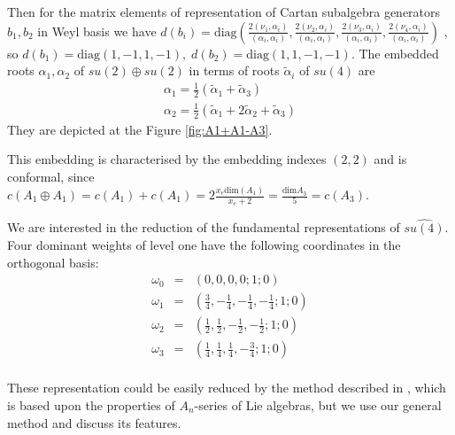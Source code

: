 \documentclass[a4paper,12pt]{article}
\theoremstyle{definition} \newtheorem{Def}{Definition}
\begin{document}
Then for the matrix elements of representation of Cartan subalgebra generators $b_1,b_2$ in Weyl basis we have $d(b_i)=\mathrm{diag}\left(\frac{2(\nu_1,\alpha_i)}{(\alpha_i,\alpha_i)},\frac{2(\nu_2,\alpha_i)}{(\alpha_i,\alpha_i)},\frac{2(\nu_3,\alpha_i)}{(\alpha_i,\alpha_i)},\frac{2(\nu_4,\alpha_i)}{(\alpha_i,\alpha_i)}\right)$ \cite{vasilevich1986method}, so $d(b_1)=\mathrm{diag}(1,-1,1,-1),\; d(b_2)=\mathrm{diag}(1,1,-1,-1)$.  The embedded roots $\alpha_1,\alpha_2$ of $su(2)\oplus su(2)$ in terms of roots $\tilde{\alpha}_i$ of $su(4)$ are
\begin{equation}
  \label{eq:37}
  \begin{array}{l}
     \alpha_1=\frac{1}{2}(\tilde{\alpha}_1+\tilde{\alpha}_3)\\
     \alpha_2=\frac{1}{2}(\tilde{\alpha}_1+2\tilde{\alpha}_2+\tilde{\alpha}_3)
  \end{array}
\end{equation}
They are depicted at the Figure \ref{fig:A1+A1-A3}.

This embedding is characterised by the embedding indexes $(2,2)$ and is conformal, since $c(A_1\oplus A_1)=c(A_1)+c(A_1)=2\frac{x_e \mathrm{dim}(A_1)}{x_e+2}=\frac{\mathrm{dim}A_3}{5}=c(A_3)$.

We are interested in the reduction of the fundamental representations of $\widehat{su(4)}$.
Four dominant weights of level one have the following coordinates in the orthogonal basis: 
\begin{equation}
  \begin{array}{lll}
     \omega_0 & = & (0,0,0,0;1;0)\\
     \omega_1 & = & (\frac{3}{4},-\frac{1}{4},-\frac{1}{4},-\frac{1}{4}; 1; 0)\\
     \omega_2 & = & (\frac{1}{2},\frac{1}{2},-\frac{1}{2},-\frac{1}{2}; 1; 0)\\
     \omega_3 & = & (\frac{1}{4},\frac{1}{4},\frac{1}{4},-\frac{3}{4}; 1; 0) \\
  \end{array}
\end{equation}

These representation could be easily reduced by the method described in \cite{walton1989conformal}, which is based upon the properties of $A_n$-series of Lie algebras, but we use our general method and discuss its features.
\end{document}
